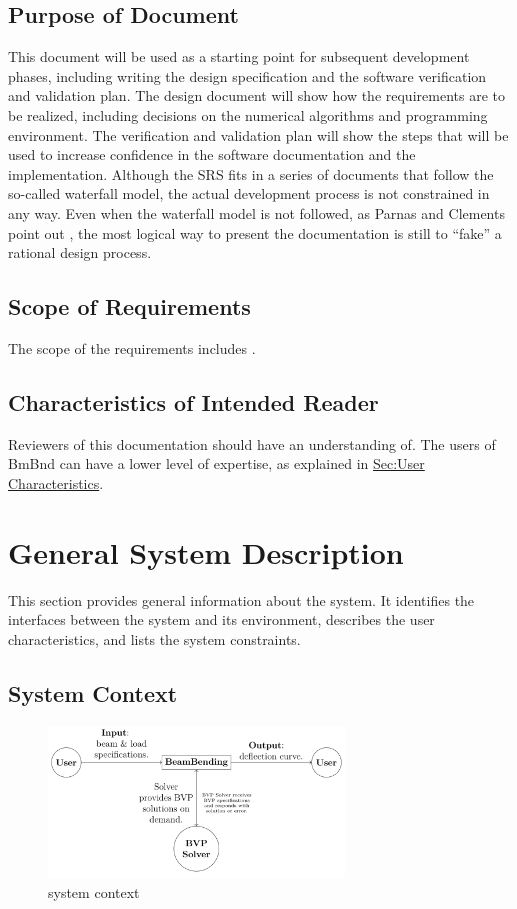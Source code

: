 \documentclass[12pt]{article}
\begin{document}
\subsection{Purpose of Document}
\label{Sec:DocPurpose}
This document will be used as a starting point for subsequent development phases, including writing the design specification and the software verification and validation plan. The design document will show how the requirements are to be realized, including decisions on the numerical algorithms and programming environment. The verification and validation plan will show the steps that will be used to increase confidence in the software documentation and the implementation. Although the SRS fits in a series of documents that follow the so-called waterfall model, the actual development process is not constrained in any way. Even when the waterfall model is not followed, as Parnas and Clements point out \cite{parnasClements1986}, the most logical way to present the documentation is still to ``fake'' a rational design process.

\subsection{Scope of Requirements}
\label{Sec:ReqsScope}
The scope of the requirements includes .

\subsection{Characteristics of Intended Reader}
\label{Sec:ReaderChars}
Reviewers of this documentation should have an understanding of. The users of BmBnd can have a lower level of expertise, as explained in \hyperref[Sec:UserChars]{Sec:User Characteristics}.

\section{General System Description}
\label{Sec:GenSysDesc}
This section provides general information about the system. It identifies the interfaces between the system and its environment, describes the user characteristics, and lists the system constraints.

\subsection{System Context}
\label{Sec:SysContext}
\begin{figure}
\begin{center}
\includegraphics[width=0.7\textwidth]{../../../../datafiles/bmbnd/system context.png}
\caption{system context}
\label{Figure:sysCxt}
\end{center}
\end{figure}
\end{document}

